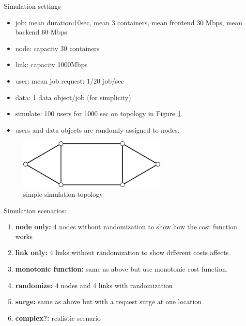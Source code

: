 
Simulation settings
\begin{itemize}
  \item		job: mean duration:10sec, mean 3 containers,
        mean frontend 30 Mbps, mean backend 60 Mbps
  \item		node: capacity 30 containers
  \item		link: capacity 1000Mbps
  \item		user: mean job request: 1/20 job/sec
  \item		data: 1 data object/job (for simplicity)
  \item		simulate: 100 users for 1000 sec on topology in Figure \ref{fig:topology-simple}.
  \item		users and data objects are randomly assigned to nodes.
\end{itemize}

\begin{figure}[htb]
  \begin{center}
    \includegraphics[width=7.5cm,clip]{topology-simple.pdf}
    \vspace{-2.0ex}
    \caption{simple simulation topology}
    \label{fig:topology-simple}
  \end{center}
\end{figure}

Simulation scenarios:

\begin{enumerate}
  \item	{\bf node only:} 4 nodes without randomization to show how the
        cost function works
  \item	{\bf link only:} 4 links without randomization to show
        different costs affects
  \item	{\bf monotonic function:} same as above but use monotonic cost
        function.
  \item	{\bf randomize:} 4 nodes and 4 links with randomization
  \item	{\bf surge:} same as above but with a request surge at one location
  \item	{\bf complex?:} realistic scenario
\end{enumerate}
